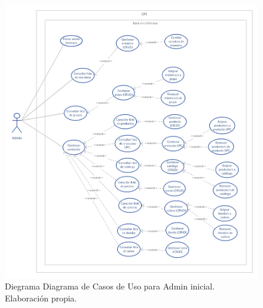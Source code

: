   \begin{figure}[H]
  \begin{center}
  \includegraphics[width=\textwidth]{cu_admin.png}
  \caption{Diegrama Diagrama de Casos de Uso para Admin inicial. Elaboración propia.}
  \label{fig:cu_admin_inicial}
  \end{center}
  \end{figure}

